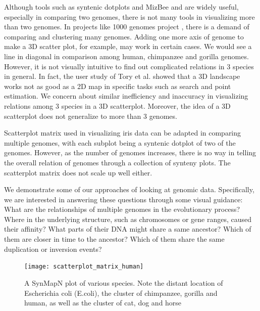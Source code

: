 \documentclass{vgtc}                      %
\begin{document}
Although tools such as syntenic dotplots and MizBee \cite{meyer2009mizbee} and are widely useful, especially in comparing two genomes, there is not many tools in visualizing more than two genomes. In projects like 1000 genomes project \cite{1000genomes}, there is a demand of comparing and clustering many genomes. Adding one more axis of genome to make a 3D scatter plot, for example, may work in certain cases. We would see a line in  diagonal in comparison among human, chimpanzee and gorilla genomes\cite{synmap3durl}. However, it is not visually intuitive to find out complicated relations in 3 species in general. 
In fact, the user study of Tory et al. \cite{tory2007spatialization} showed that a 3D landscape works not as good as a 2D map in specific tasks such as search and point estimation. We concern about similar inefficiency and inaccuracy in visualizing relations among 3 species in a 3D scatterplot. Moreover, the idea of a 3D scatterplot does not generalize to more than 3 genomes.

Scatterplot matrix used in visualizing iris data can be adapted in comparing multiple genomes, with each subplot being a syntenic dotplot of two of the genomes. However, as the number of genomes increases, there is no way in telling the overall relation of genomes through a collection of synteny plots. The scatterplot matrix does not scale up well either.

We demonstrate some of our approaches of looking at genomic data. Specifically, we are interested in answering these questions through some visual guidance: What are the relationships of multiple genomes in the evolutionary process? Where in the underlying structure, such as chromosomes or gene ranges, caused their affinity? What parts of their DNA might share a same ancestor? Which of them are closer in time to the ancestor? Which of them share the same duplication or inversion events?



\begin{figure}[t]
 \centering
 \texttt{[image: scatterplot\_matrix\_human]}
 \caption{A SynMapN plot of various species. Note the distant location of Escherichia coli (E.coli), the cluster of chimpanzee, gorilla and human, as well as the cluster of cat, dog and horse}
 \label{fig:scatterplot_matrix_human}
\end{figure}
\end{document}

